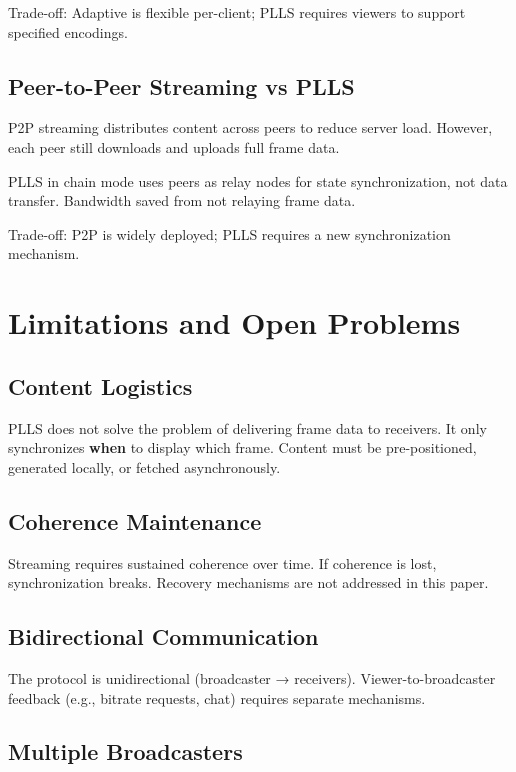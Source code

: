 \documentclass[twocolumn,10pt,a4paper]{article}
\theoremstyle{plain}
\theoremstyle{definition}
\begin{document}
Trade-off: Adaptive is flexible per-client; PLLS requires viewers to support specified encodings.

\subsection{Peer-to-Peer Streaming vs PLLS}

P2P streaming distributes content across peers to reduce server load. However, each peer still downloads and uploads full frame data.

PLLS in chain mode uses peers as relay nodes for state synchronization, not data transfer. Bandwidth saved from not relaying frame data.

Trade-off: P2P is widely deployed; PLLS requires a new synchronization mechanism.

\section{Limitations and Open Problems}
\label{sec:open}

\subsection{Content Logistics}

PLLS does not solve the problem of delivering frame data to receivers. It only synchronizes \textbf{when} to display which frame. Content must be pre-positioned, generated locally, or fetched asynchronously.

\subsection{Coherence Maintenance}

Streaming requires sustained coherence over time. If coherence is lost, synchronization breaks. Recovery mechanisms are not addressed in this paper.

\subsection{Bidirectional Communication}

The protocol is unidirectional (broadcaster → receivers). Viewer-to-broadcaster feedback (e.g., bitrate requests, chat) requires separate mechanisms.

\subsection{Multiple Broadcasters}
\end{document}
